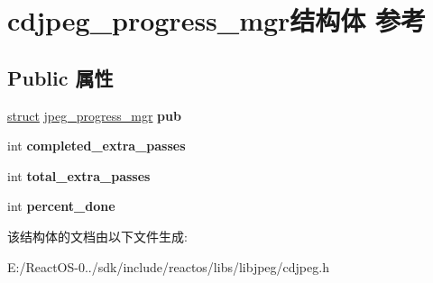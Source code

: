 \hypertarget{structcdjpeg__progress__mgr}{}\section{cdjpeg\+\_\+progress\+\_\+mgr结构体 参考}
\label{structcdjpeg__progress__mgr}
\subsection*{Public 属性}
\begin{DoxyCompactItemize}
\item 
\mbox{\label{structcdjpeg__progress__mgr_a6303d12ac00b08da19794945793f983f}} 
\hyperlink{interfacestruct}{struct} \hyperlink{structjpeg__progress__mgr}{jpeg\+\_\+progress\+\_\+mgr} {\bfseries pub}
\item 
\mbox{\label{structcdjpeg__progress__mgr_a6f5f9744a8fc43219bbb42d1757820e6}} 
int {\bfseries completed\+\_\+extra\+\_\+passes}
\item 
\mbox{\label{structcdjpeg__progress__mgr_a05c1a823d40d937b105e3ba2c13bc00d}} 
int {\bfseries total\+\_\+extra\+\_\+passes}
\item 
\mbox{\label{structcdjpeg__progress__mgr_a73fad2ed10876758edc5523d1cb10f8f}} 
int {\bfseries percent\+\_\+done}
\end{DoxyCompactItemize}


该结构体的文档由以下文件生成\+:\begin{DoxyCompactItemize}
\item 
E\+:/\+React\+O\+S-\/0../sdk/include/reactos/libs/libjpeg/cdjpeg.\+h\end{DoxyCompactItemize}
